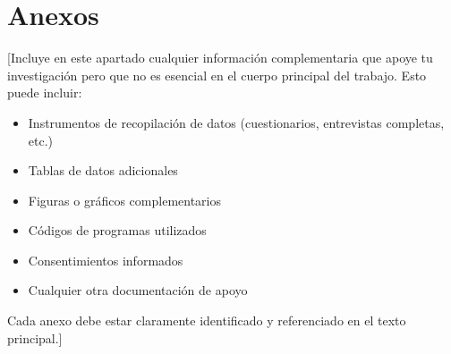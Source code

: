 \appendix

\chapter{Anexos}

[Incluye en este apartado cualquier información complementaria que apoye tu investigación pero
que no es esencial en el cuerpo principal del trabajo. Esto puede incluir:

\begin{itemize}
    \item Instrumentos de recopilación de datos (cuestionarios, entrevistas completas, etc.)
    \item Tablas de datos adicionales
    \item Figuras o gráficos complementarios
    \item Códigos de programas utilizados
    \item Consentimientos informados
    \item Cualquier otra documentación de apoyo
\end{itemize}

Cada anexo debe estar claramente identificado y referenciado en el texto principal.]
